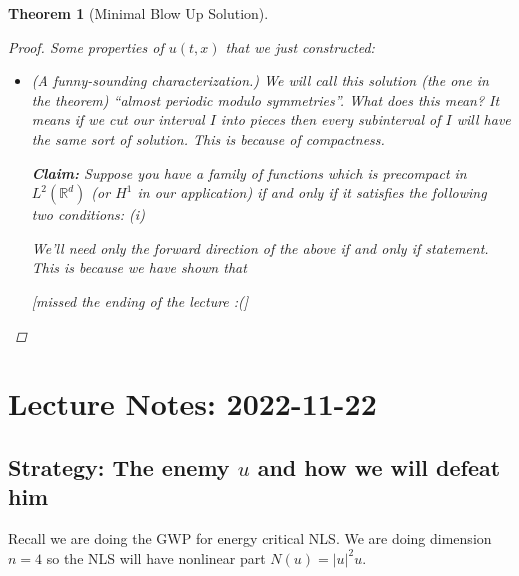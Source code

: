 \documentclass{article}
\def\purple{\color{Purple}}
\newcommand{\pnote}[1]{{\purple [#1]}} %
\newtheorem{theorem}{Theorem}
\def\R{\mathbb{R}} %
\begin{document}
\begin{theorem}[Minimal Blow Up Solution]
\begin{proof}
    Some properties of $u(t,x)$ that we just constructed:
    \begin{itemize}
      \item (A funny-sounding characterization.) We will call this solution (the
      one in the theorem) ``almost periodic modulo symmetries''. What does this
      mean? It means if we cut our interval $I$ into pieces then every
      subinterval of $I$ will have the same sort of solution. This is because of
      compactness.

      \textbf{Claim: }Suppose you have a family of functions which is precompact
      in $L^{2}(\R^d)$ (or $H^{1}$ in our application) if and only if it
      satisfies the following two conditions: (i)

      We'll need only the forward direction of the above if and only if
      statement. This is because we have shown that

      \pnote{missed the ending of the lecture :(}
    \end{itemize}
  \end{proof}
\end{theorem}

\section{Lecture Notes: 2022-11-22}
\subsection{Strategy: The enemy $u$ and how we will defeat him}
Recall we are doing the GWP for energy critical NLS. We are doing dimension $n=4$
so the NLS will have nonlinear part $N(u)=|u|^{2}u$.
\end{document}
